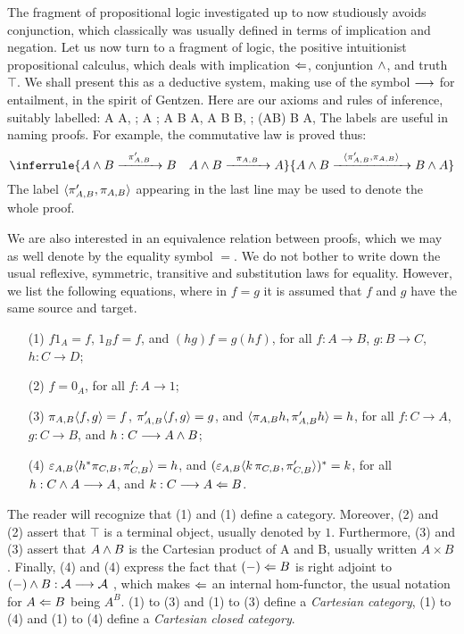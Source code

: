 The fragment of propositional logic investigated up to now studiously avoids
conjunction, which classically was usually defined in terms of implication and negation.
Let us now turn to a fragment of logic, the positive intuitionist propositional calculus,
which deals with implication $\Leftarrow$, conjuntion $\wedge$, and truth $\top$.
We shall present this as a deductive system, making use of the symbol $\longrightarrow$ for entailment,
in the spirit of Gentzen. Here are our axioms and rules of inference, suitably labelled:
\bes
A  A, \qquad {};
\ees
\bes
A  \top;
\ees
\bes
A \sland B \xto{\prAB} A,\,\,A \sland B \xto{\prpAB} B, \quad
{};
\ees
\bes
(A\from B) \sland B  A, \qquad {}
\ees
The labels are useful in naming proofs. For example, the commutative law is proved thus:
$$
\inferrule{A \sland B \xto{\prpAB} B\quad A \sland B \xto{\prAB} A}{A \sland B \xto{\bracket{\prpAB,\prAB}} B\sland A}
$$
The label $\langle \pi'_{A,B},\pi_{A,B} \rangle$ appearing in the last line may be used
to denote the whole proof.

We are also interested in an equivalence relation between proofs,
which we may as well denote by the equality symbol $=$. We do not bother to
write down the usual reflexive, symmetric, transitive and substitution laws for
equality. However, we list the following equations, where in $f = g$ it is
assumed that $f$ and $g$ have the same source and target.
\begin{enumerate}[align=left]
\item[(1\mprime)]$f1_A = f$, $1_Bf = f$, and $(hg)f = g(hf)$,
 for all $f:A \to B$, $g:B \to C$, $h: C\to D$;
\item[(2\mprime)] $f= 0_A$, for all $f: A \to 1$;
\item[(3\mprime)] $\pi_{A,B}\langle f,g \rangle = f$, $\pi'_{A,B}\langle f,g \rangle= g$, and
$\langle\pi_{A,B} h, \pi'_{A,B} h\rangle = h$, for all $f:C \to A$, $g:C \to B$, and $h: C\longrightarrow A\wedge B$;
\item[(4\mprime)] $\varepsilon_{A,B}\langle h^*\pi_{C,B}, \pi'_{C,B} \rangle = h$, and
$(\varepsilon_{A,B}\langle k\,\pi_{C,B}, \pi'_{C,B} \rangle)^* = k$,
for all $h: C\wedge A \longrightarrow A$, and $k: C \longrightarrow A \Leftarrow B$.
\end{enumerate}
The reader will recognize that (1) and (1\mprime) define a category.
Moreover, (2) and (2\mprime) assert that $\top$
is a terminal object, usually denoted by $1$.
Furthermore, (3) and (3\mprime) assert that $A \wedge B$ is the Cartesian product
of A and B, usually written $A \times B$.
Finally, (4) and (4\mprime) express the fact that $(-) \Leftarrow B$ is right adjoint to
$(-) \wedge B: {\cal A} \longrightarrow {\cal A}$ , which makes $\Leftarrow$ an internal hom-functor, the
usual notation for $A \Leftarrow B$ being $A^B$.
(1) to (3) and (1\mprime) to (3\mprime) define a {\it Cartesian category},
(1) to (4) and (1\mprime) to (4\mprime) define a {\it Cartesian closed category}.

